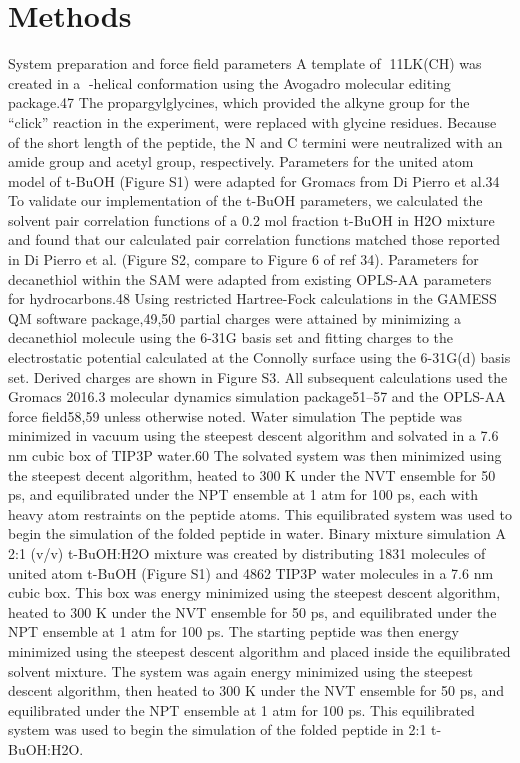 \section{Methods}
%

System preparation and force field parameters
A template of 11LK(CH) was created in a -helical conformation using the Avogadro molecular editing package.47 The propargylglycines, which provided the alkyne group for the “click” reaction in the experiment, were replaced with glycine residues. Because of the short length of the peptide, the N and C termini were neutralized with an amide group and acetyl group, respectively. Parameters for the united atom model of t-BuOH (Figure S1) were adapted for Gromacs from Di Pierro et al.34 To validate our implementation of the t-BuOH parameters, we calculated the solvent pair correlation functions of a 0.2 mol fraction t-BuOH in H2O mixture and found that our calculated pair correlation functions matched those reported in Di Pierro et al. (Figure S2, compare to Figure 6 of ref 34). Parameters for decanethiol within the SAM were adapted from existing OPLS-AA parameters for hydrocarbons.48 Using restricted Hartree-Fock calculations in the GAMESS QM software package,49,50 partial charges were attained by minimizing a decanethiol molecule using the 6-31G basis set and fitting charges to the electrostatic potential calculated at the Connolly surface using the 6-31G(d) basis set. Derived charges are shown in Figure S3. All subsequent calculations used the Gromacs 2016.3 molecular dynamics simulation package51–57 and the OPLS-AA force field58,59 unless otherwise noted.
Water simulation
The peptide was minimized in vacuum using the steepest descent algorithm and solvated in a 7.6 nm cubic box of TIP3P water.60 The solvated system was then minimized using the steepest decent algorithm, heated to 300 K under the NVT ensemble for 50 ps, and equilibrated under the NPT ensemble at 1 atm for 100 ps, each with heavy atom restraints on the peptide atoms. This equilibrated system was used to begin the simulation of the folded peptide in water.
Binary mixture simulation
A 2:1 (v/v) t-BuOH:H2O mixture was created by distributing 1831 molecules of united atom t-BuOH (Figure S1) and 4862 TIP3P water molecules in a 7.6 nm cubic box. This box was energy minimized using the steepest descent algorithm, heated to 300 K under the NVT ensemble for 50 ps, and equilibrated under the NPT ensemble at 1 atm for 100 ps. The starting peptide was then energy minimized using the steepest descent algorithm and placed inside the equilibrated solvent mixture. The system was again energy minimized using the steepest descent algorithm, then heated to 300 K under the NVT ensemble for 50 ps, and equilibrated under the NPT ensemble at 1 atm for 100 ps. This equilibrated system was used to begin the simulation of the folded peptide in 2:1 t-BuOH:H2O.
